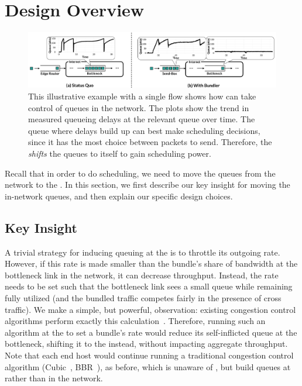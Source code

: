 \section{Design Overview}\label{s:design}

\begin{figure}
    \centering
    \includegraphics[width=\textwidth]{img/shift-bottleneck-combined}
    \caption{This illustrative example with a single flow shows how \name can take control of queues in the network. The plots show the trend in measured queueing delays at the relevant queue over time. The queue where delays build up can best make scheduling decisions, since it has the most choice between packets to send. Therefore, the \inbox \emph{shifts} the queues to itself to gain scheduling power.}\label{fig:design:shift-bottleneck}
\end{figure}

Recall that in order to do scheduling, we need to move the queues from the network to the \name. 
In this section, we first describe our key insight for moving the in-network queues, and then explain our specific design choices. 

\subsection{Key Insight}
A trivial strategy for inducing queuing at the \name is to throttle its outgoing rate. However, if this rate is made smaller than the bundle's share of bandwidth at the bottleneck link in the network, it can decrease throughput. Instead, the rate needs to be set such that the bottleneck link sees a small queue while remaining fully utilized (and the bundled traffic competes fairly in the presence of cross traffic). 
We make a simple, but powerful, observation: existing congestion control algorithms perform exactly this calculation~\cite{Jacobson88}. 
Therefore, running such an algorithm at the \inbox to set a bundle's rate would reduce its self-inflicted queue at the bottleneck, shifting it to the \inbox instead, without impacting aggregate throughput. 
Note that each end host would continue running a traditional congestion control algorithm (\eg Cubic~\cite{cubic}, BBR~\cite{bbr}), as before, which is unaware of \name, but build queues at \inbox rather than in the network.

